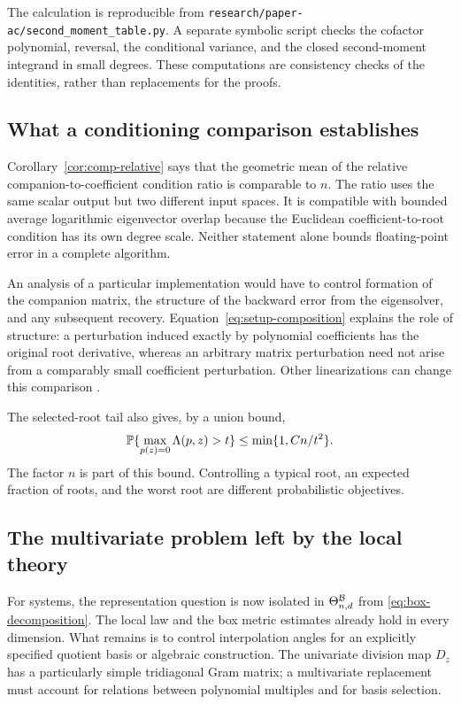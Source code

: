 The calculation is reproducible from
\texttt{research/paper-ac/second\_moment\_table.py}. A separate symbolic script
checks the cofactor polynomial, reversal, the conditional variance, and the
closed second-moment integrand in small degrees. These computations are
consistency checks of the identities, rather than replacements for the proofs.

\subsection{What a conditioning comparison establishes}

Corollary~\ref{cor:comp-relative} says that the geometric mean of the relative
companion-to-coefficient condition ratio is comparable to $n$. The ratio uses
the same scalar output but two different input spaces. It is compatible with
bounded average logarithmic eigenvector overlap because the Euclidean
coefficient-to-root condition has its own degree scale. Neither statement
alone bounds floating-point error in a complete algorithm.

An analysis of a particular implementation would have to control formation of
the companion matrix, the structure of the backward error from the eigensolver,
and any subsequent recovery. Equation~\eqref{eq:setup-composition} explains
the role of structure: a perturbation induced exactly by polynomial
coefficients has the original root derivative, whereas an arbitrary matrix
perturbation need not arise from a comparably small coefficient perturbation.
Other linearizations can change this comparison
\cite{toh1994pseudozeros,deteran2017eigenvalue}.

The selected-root tail also gives, by a union bound,
\[
 \mathbb P\{\max_{p(z)=0}\Lambda(p,z)>t\}\le\min\{1,Cn/t^2\}.
\]
The factor $n$ is part of this bound. Controlling a typical root, an expected
fraction of roots, and the worst root are different probabilistic objectives.

\subsection{The multivariate problem left by the local theory}

For systems, the representation question is now isolated in
$\Theta_{n,d}^{\mathcal B}$ from \eqref{eq:box-decomposition}. The local law and the
box metric estimates already hold in every dimension. What remains is to
control interpolation angles for an explicitly specified quotient basis or
algebraic construction. The univariate division map $D_z$ has a particularly
simple tridiagonal Gram matrix; a multivariate replacement must account for
relations between polynomial multiples and for basis selection.

